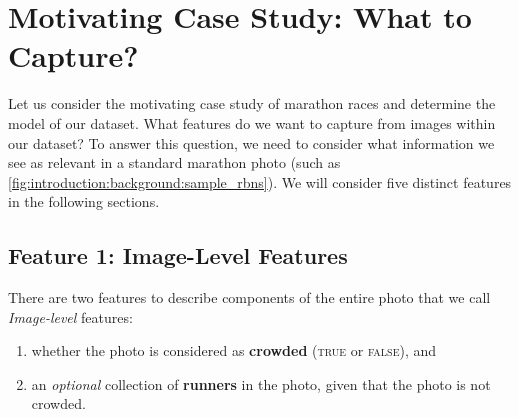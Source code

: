 \section{Motivating Case Study: What to Capture?}
\label{sec:dataset:architecture:what_to_capture}

Let us consider the motivating case study of marathon races and determine the model of our dataset. What features do we want to capture from images within our dataset? To answer this question, we need to consider what information we see as relevant in a standard marathon photo (such as \cref{fig:introduction:background:sample_rbns}). We will consider five distinct features in the following sections.

\clearpage
\subsection{Feature 1: Image-Level Features}

There are two features to describe components of the entire photo that we call \textit{Image-level} features:

\begin{enumerate}
  \item whether the photo is considered as \textbf{crowded} (\textsc{true} or \textsc{false}), and
  \item an \textit{optional} collection of \textbf{runners} in the photo, given that the photo is not crowded.
\end{enumerate}

